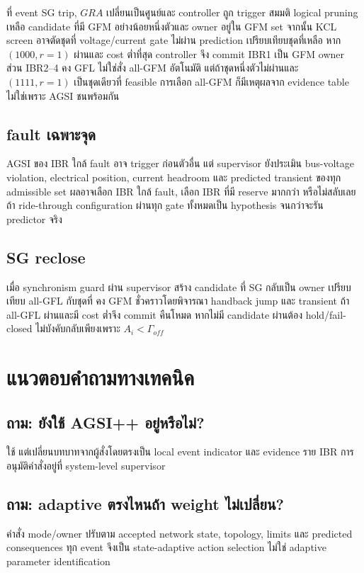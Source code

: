 \documentclass[12pt,a4paper]{article}
\begin{document}
ที่ event SG trip, $GRA$ เปลี่ยนเป็นศูนย์และ controller ถูก trigger สมมติ logical pruning เหลือ candidate
ที่มี GFM อย่างน้อยหนึ่งตัวและ owner อยู่ใน GFM set จากนั้น KCL screen อาจตัดชุดที่ voltage/current gate
ไม่ผ่าน prediction เปรียบเทียบชุดที่เหลือ หาก $(1000,r=1)$ ผ่านและ cost ต่ำที่สุด controller จึง commit
IBR1 เป็น GFM owner ส่วน IBR2--4 คง GFL ไม่ใช่สั่ง all-GFM อัตโนมัติ แต่ถ้าชุดหนึ่งตัวไม่ผ่านและ
$(1111,r=1)$ เป็นชุดเดียวที่ feasible การเลือก all-GFM ก็มีเหตุผลจาก evidence table ไม่ใช่เพราะ AGSI ชนพร้อมกัน

\subsection{fault เฉพาะจุด}

AGSI ของ IBR ใกล้ fault อาจ trigger ก่อนตัวอื่น แต่ supervisor ยังประเมิน bus-voltage violation,
electrical position, current headroom และ predicted transient ของทุก admissible set ผลอาจเลือก IBR ใกล้ fault,
เลือก IBR ที่มี reserve มากกว่า หรือไม่สลับเลยถ้า ride-through configuration ผ่านทุก gate ทั้งหมดเป็น hypothesis
จนกว่าจะรัน predictor จริง

\subsection{SG reclose}

เมื่อ synchronism guard ผ่าน supervisor สร้าง candidate ที่ SG กลับเป็น owner เปรียบเทียบ all-GFL กับชุดที่
คง GFM ชั่วคราวโดยพิจารณา handback jump และ transient ถ้า all-GFL ผ่านและมี cost ต่ำจึง commit คืนโหมด
หากไม่มี candidate ผ่านต้อง hold/fail-closed ไม่บังคับกลับเพียงเพราะ $A_i<\Gamma_{off}$

\section{แนวตอบคำถามทางเทคนิค}

\subsection*{ถาม: ยังใช้ AGSI++ อยู่หรือไม่?}
ใช้ แต่เปลี่ยนบทบาทจากผู้สั่งโดยตรงเป็น local event indicator และ evidence ราย IBR การอนุมัติคำสั่งอยู่ที่
system-level supervisor

\subsection*{ถาม: adaptive ตรงไหนถ้า weight ไม่เปลี่ยน?}
คำสั่ง mode/owner ปรับตาม accepted network state, topology, limits และ predicted consequences ทุก event
จึงเป็น state-adaptive action selection ไม่ใช่ adaptive parameter identification
\end{document}

